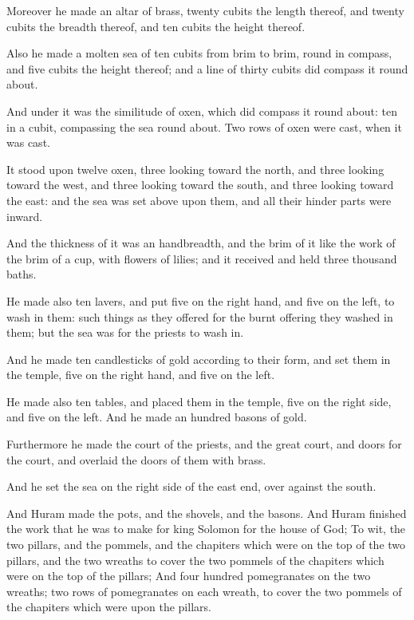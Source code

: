 \Chapter
\Verse Moreover he made an altar of brass, twenty cubits the length thereof, and twenty cubits the breadth thereof, and ten cubits the height thereof.

\Verse Also he made a molten sea of ten cubits from brim to brim, round in compass, and five cubits the height thereof; and a line of thirty cubits did compass it round about.

\Verse And under it was the similitude of oxen, which did compass it round about: ten in a cubit, compassing the sea round about. Two rows of oxen were cast, when it was cast.

\Verse It stood upon twelve oxen, three looking toward the north, and three looking toward the west, and three looking toward the south, and three looking toward the east: and the sea was set above upon them, and all their hinder parts were inward.

\Verse And the thickness of it was an handbreadth, and the brim of it like the work of the brim of a cup, with flowers of lilies; and it received and held three thousand baths.

\Verse He made also ten lavers, and put five on the right hand, and five on the left, to wash in them: such things as they offered for the burnt offering they washed in them; but the sea was for the priests to wash in.

\Verse And he made ten candlesticks of gold according to their form, and set them in the temple, five on the right hand, and five on the left.

\Verse He made also ten tables, and placed them in the temple, five on the right side, and five on the left. And he made an hundred basons of gold.

\Verse Furthermore he made the court of the priests, and the great court, and doors for the court, and overlaid the doors of them with brass.

\Verse And he set the sea on the right side of the east end, over against the south.

\Verse And Huram made the pots, and the shovels, and the basons. And Huram finished the work that he was to make for king Solomon for the house of God; \Verse To wit, the two pillars, and the pommels, and the chapiters which were on the top of the two pillars, and the two wreaths to cover the two pommels of the chapiters which were on the top of the pillars; \Verse And four hundred pomegranates on the two wreaths; two rows of pomegranates on each wreath, to cover the two pommels of the chapiters which were upon the pillars.

